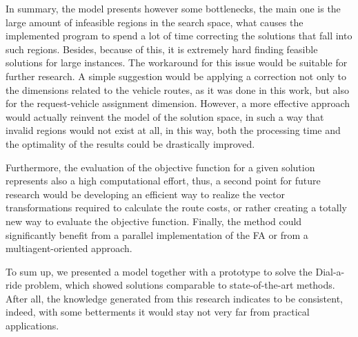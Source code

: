 \documentclass[tuberlin,cic,tc,openright,english,noabntcite,oneside]{iiufrgs}
\begin{document}
In summary, the model presents however some bottlenecks, the main one is the large amount of infeasible regions in the search space, what causes the implemented program to spend a lot of time correcting the solutions that fall into such regions. Besides, because of this, it is extremely hard finding feasible solutions for large instances. The workaround for this issue would be suitable for further research. A simple suggestion would be applying a correction not only to the dimensions related to the vehicle routes, as it was done in this work, but also for the request-vehicle assignment dimension. However, a more effective approach would actually reinvent the model of the solution space, in such a way that invalid regions would not exist at all, in this way, both the processing time and the optimality of the results could be drastically improved.

Furthermore, the evaluation of the objective function for a given solution represents also a high computational effort, thus, a second point for future research would be developing an efficient way to realize the vector transformations required to calculate the route costs, or rather creating a totally new way to evaluate the objective function. Finally, the method could significantly benefit from a parallel implementation of the FA or from a multiagent-oriented approach.

To sum up, we presented a model together with a prototype to solve the Dial-a-ride problem, which showed solutions comparable to state-of-the-art methods. After all, the knowledge generated from this research indicates to be consistent, indeed, with some betterments it would stay not very far from practical applications.
\nocite{*}
%
\printbibliography
\end{document}
